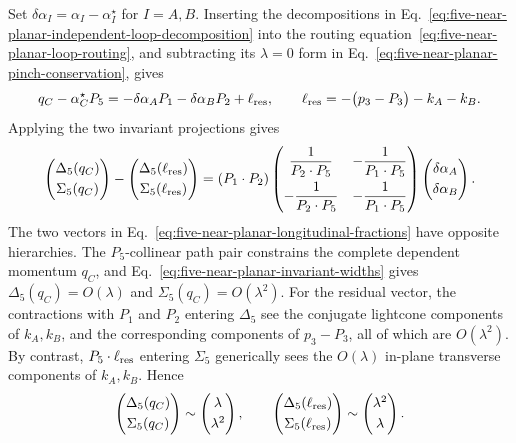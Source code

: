 \documentclass[a4paper,11pt]{article}
\begin{document}
Set \(\delta\alpha_I=\alpha_I-\alpha_I^\star\) for \(I=A,B\).  Inserting the
decompositions in
Eq.~\eqref{eq:five-near-planar-independent-loop-decomposition} into the
routing equation~\eqref{eq:five-near-planar-loop-routing}, and subtracting
its \(\lambda=0\) form in
Eq.~\eqref{eq:five-near-planar-pinch-conservation}, gives
\begin{equation}
 q_C-\alpha_C^\star P_5
 =-\delta\alpha_AP_1-\delta\alpha_BP_2+\ell_{\rm res},
 \qquad
 \ell_{\rm res}=-\bigl(p_3-P_3\bigr)-k_A-k_B.
 \label{eq:five-near-planar-residual-routing}
\end{equation}
Applying the two invariant projections gives
\begin{equation}
 \begin{pmatrix}
  \Delta_5(q_C)\\[1mm]
  \Sigma_5(q_C)
 \end{pmatrix}
 -
 \begin{pmatrix}
  \Delta_5(\ell_{\rm res})\\[1mm]
  \Sigma_5(\ell_{\rm res})
 \end{pmatrix}
 =
 (P_1\mathbin\cdot P_2)
 \begin{pmatrix}
  \dfrac{1}{P_2\mathbin\cdot P_5}
   &-\dfrac{1}{P_1\mathbin\cdot P_5}\\[3mm]
  -\dfrac{1}{P_2\mathbin\cdot P_5}
   &-\dfrac{1}{P_1\mathbin\cdot P_5}
 \end{pmatrix}
 \begin{pmatrix}
  \delta\alpha_A\\[1mm]
  \delta\alpha_B
 \end{pmatrix}.
 \label{eq:five-near-planar-longitudinal-fractions}
\end{equation}
The two vectors in Eq.~\eqref{eq:five-near-planar-longitudinal-fractions}
have opposite hierarchies.  The \(P_5\)-collinear path pair constrains
the complete dependent momentum \(q_C\), and
Eq.~\eqref{eq:five-near-planar-invariant-widths} gives
\(\Delta_5(q_C)=O(\lambda)\) and
\(\Sigma_5(q_C)=O(\lambda^2)\).  For the residual vector, the contractions
with \(P_1\) and \(P_2\) entering \(\Delta_5\) see the conjugate lightcone
components of \(k_A,k_B\), and the corresponding components of
\(p_3-P_3\), all of which are \(O(\lambda^2)\).  By contrast,
\(P_5\mathbin\cdot\ell_{\rm res}\) entering \(\Sigma_5\) generically sees
the \(O(\lambda)\) in-plane transverse components of \(k_A,k_B\).  Hence
\[
 \begin{pmatrix}
  \Delta_5(q_C)\\[1mm]\Sigma_5(q_C)
 \end{pmatrix}
 \sim
 \begin{pmatrix}\lambda\\[1mm]\lambda^2\end{pmatrix},
 \qquad
 \begin{pmatrix}
  \Delta_5(\ell_{\rm res})\\[1mm]\Sigma_5(\ell_{\rm res})
 \end{pmatrix}
 \sim
 \begin{pmatrix}\lambda^2\\[1mm]\lambda\end{pmatrix}.
\]
\end{document}
